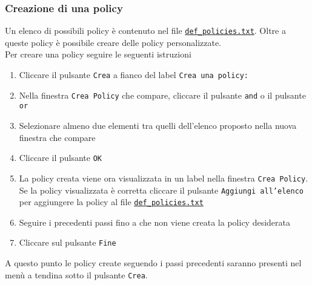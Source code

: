 \documentclass[a4paper,twoside,10pt,openany]{scrbook}
\begin{document}
\subsubsection{Creazione di una policy}\label{sec:create_policy}
%
Un elenco di possibili policy è contenuto nel file \texttt{\hyperref[sec:file_policies]{def\_policies.txt}}. Oltre a queste policy è possibile creare delle policy personalizzate.\\
Per creare una policy seguire le seguenti istruzioni
\begin{enumerate}
 \item Cliccare il pulsante \texttt{Crea} a fianco del label \texttt{Crea una policy:}
 \item Nella finestra \texttt{Crea Policy} che compare, cliccare il pulsante \texttt{and} o il pulsante \texttt{or}
 \item Selezionare almeno due elementi tra quelli dell'elenco proposto nella nuova finestra che compare
 \item Cliccare il pulsante \texttt{OK}
 \item La policy creata viene ora visualizzata in un label nella finestra \texttt{Crea Policy}. Se la policy visualizzata è corretta cliccare il pulsante \texttt{Aggiungi all'elenco} per aggiungere la policy al file \texttt{\hyperref[sec:file_policies]{def\_policies.txt}}
 \item Seguire i precedenti passi fino a che non viene creata la policy desiderata
 \item Cliccare sul pulsante \texttt{Fine} 
\end{enumerate}
A questo punto le policy create seguendo i passi precedenti saranno presenti nel menù a tendina sotto il pulsante \texttt{Crea}.
%
\end{document}
